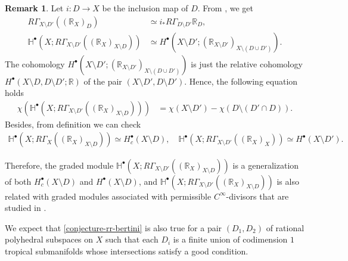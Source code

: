 \documentclass[a4paper,dvipdfmx,reqno,12pt]{amsart}
\theoremstyle{definition}
\newtheorem{remark}[theorem]{Remark}
\numberwithin{equation}{section}
\begin{document}
\begin{remark}
Let $i\colon D\to X$ be the inclusion map of $D$.
From 
\cite[(2.3.20)]{MR1299726}, we get
\begin{align}
R\Gamma_{X\setminus D'}((\mathbb{R}_X)_D)
&\simeq i_* R\Gamma_{D\setminus D'}\mathbb{R}_D, \\ 
\mathbb{H}^{\bullet}(X;R\Gamma_{X\setminus D'}((\mathbb{R}_X)_{X\setminus D}))
&\simeq H^{\bullet}(X\setminus D';(\mathbb{R}_{X\setminus D'})_{X\setminus (D\cup D')}).
\end{align}
The cohomology $H^{\bullet}(X\setminus D';(\mathbb{R}_{X\setminus D'})_{X\setminus (D\cup D')})$
is just the relative cohomology 
$H^{\bullet}(X\setminus D,D\setminus D';\mathbb{R})$
of the pair
$(X\setminus D', D\setminus D')$.
Hence, the following equation holds
\begin{align}
\chi(\mathbb{H}^{\bullet}(X;R\Gamma_{X\setminus D'}((\mathbb{R}_X)_{X\setminus D})))
&=\chi(X\setminus D')
- \chi(D\setminus (D'\cap D)).
\end{align}
Besides, from definition we can check
\begin{align}
\mathbb{H}^{\bullet}(X;R\Gamma_{X}
((\mathbb{R}_X)_{X\setminus D}))
\simeq H^{\bullet}_c(X\setminus D), \quad
\mathbb{H}^{\bullet}(X;R\Gamma_{X\setminus D'}
((\mathbb{R}_X)_{X}))
\simeq H^{\bullet}(X\setminus D').
\end{align}

Therefore, the graded module 
$\mathbb{H}^{\bullet}(X;R\Gamma_{X\setminus D'}
((\mathbb{R}_X)_{X\setminus D}))$
is a generalization of both
$H^{\bullet}_c(X\setminus D)$ and
$H^{\bullet}(X\setminus D)$, and
$\mathbb{H}^{\bullet}(X;R\Gamma_{X\setminus D'}
((\mathbb{R}_X)_{X\setminus D}))$ is also related
with graded modules associated with
permissible $C^{\infty}$-divisors that are
studied in \cite{tsutsui2023graded}.

We expect that \cref{conjecture-rr-bertini}
is also true for a pair $(D_1,D_2)$ of rational polyhedral
subspaces on $X$ such that each $D_i$ is
a finite union of codimension $1$ tropical submanifolds whose
intersections satisfy a good condition.
\end{remark}

\appendix
\end{document}
